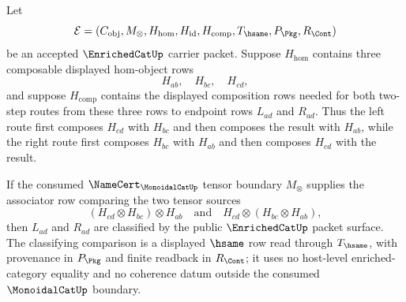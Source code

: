 \begin{theorem}\label{thm:enrichedcat-two-step-composition-reassociation}
Let
$$
\mathcal{E}=
(C_{\mathrm{obj}},M_{\otimes},H_{\mathrm{hom}},H_{\mathrm{id}},H_{\mathrm{comp}},T_{\hsame},P_{\Pkg},R_{\Cont})
$$
be an accepted $\EnrichedCatUp$ carrier packet. Suppose $H_{\mathrm{hom}}$ contains three composable displayed hom-object rows
$$
H_{ab},\quad H_{bc},\quad H_{cd},
$$
and suppose $H_{\mathrm{comp}}$ contains the displayed composition rows needed for both two-step routes from these three rows to endpoint rows $L_{ad}$ and $R_{ad}$. Thus the left route first composes $H_{cd}$ with $H_{bc}$ and then composes the result with $H_{ab}$, while the right route first composes $H_{bc}$ with $H_{ab}$ and then composes $H_{cd}$ with the result.

If the consumed $\NameCert_{\MonoidalCatUp}$ tensor boundary $M_{\otimes}$ supplies the associator row comparing the two tensor sources
$$
(H_{cd}\otimes H_{bc})\otimes H_{ab}
\quad\text{and}\quad
H_{cd}\otimes (H_{bc}\otimes H_{ab}),
$$
then $L_{ad}$ and $R_{ad}$ are classified by the public $\EnrichedCatUp$ packet surface. The classifying comparison is a displayed $\hsame$ row read through $T_{\hsame}$, with provenance in $P_{\Pkg}$ and finite readback in $R_{\Cont}$; it uses no host-level enriched-category equality and no coherence datum outside the consumed $\MonoidalCatUp$ boundary.
\end{theorem}
